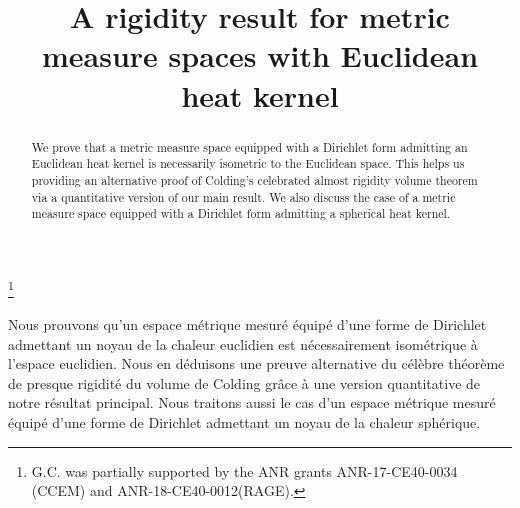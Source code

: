\documentclass[JEP,XML,SOM,Unicode,published]{cedram}
\theoremstyle{plain}
\theoremstyle{definition}
\begin{document}
\frontmatter

\title{A rigidity result for metric measure spaces with Euclidean heat kernel}

\author[\initial{G.} \lastname{Carron}]{ }
\address{Université de Nantes, Département de Mathématiques\\
2 rue de la Houssinière, BP 92208, 44322 Nantes cedex 03, France}

\thanks{G.C. was partially supported by the ANR grants ANR-17-CE40-0034 (CCEM) and ANR-18-CE40-0012(RAGE).}

\author[\initial{D.} \lastname{Tewodrose}]{ }
\address{CY Cergy Paris University, AGM\\
2 av. Adolphe Chauvin, 95302 Cergy-Pontoise cedex, France}

\begin{abstract}
We prove that a metric measure space equipped with a Dirichlet form admitting an Euclidean heat kernel is necessarily isometric to the Euclidean space. This helps us providing an alternative proof of Colding's celebrated almost rigidity volume theorem via a quantitative version of our main result. We also discuss the case of a metric measure space equipped with a Dirichlet form admitting a spherical heat kernel.
\end{abstract}





\begin{altabstract}
Nous prouvons qu'un espace métrique mesuré équipé d'une forme de Dirichlet admettant un noyau de la chaleur euclidien est nécessairement isométrique à l'espace euclidien. Nous en déduisons une preuve alternative du célèbre théorème de presque rigidité du volume de Colding grâce à une version quantitative de notre résultat principal. Nous traitons aussi le cas d'un espace métrique mesuré équipé d'une forme de Dirichlet admettant un noyau de la chaleur sphérique.
\end{altabstract}
\end{document}
